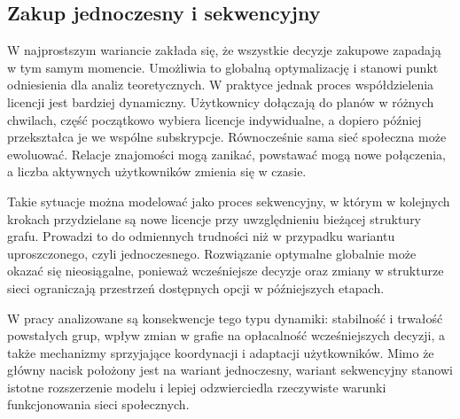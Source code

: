 

\subsection{Zakup jednoczesny i sekwencyjny}

W najprostszym wariancie zakłada się, że wszystkie decyzje zakupowe zapadają w tym samym momencie. Umożliwia to globalną optymalizację i stanowi punkt odniesienia dla analiz teoretycznych. W praktyce jednak proces współdzielenia licencji jest bardziej dynamiczny. Użytkownicy dołączają do planów w różnych chwilach, część początkowo wybiera licencje indywidualne, a dopiero później przekształca je we wspólne subskrypcje. Równocześnie sama sieć społeczna może ewoluować. Relacje znajomości mogą zanikać, powstawać mogą nowe połączenia, a liczba aktywnych użytkowników zmienia się w czasie.

Takie sytuacje można modelować jako proces sekwencyjny, w którym w kolejnych krokach przydzielane są nowe licencje przy uwzględnieniu bieżącej struktury grafu. Prowadzi to do odmiennych trudności niż w przypadku wariantu uproszczonego, czyli jednoczesnego. Rozwiązanie optymalne globalnie może okazać się nieosiągalne, ponieważ wcześniejsze decyzje oraz zmiany w strukturze sieci ograniczają przestrzeń dostępnych opcji w późniejszych etapach.

W pracy analizowane są konsekwencje tego typu dynamiki: stabilność i trwałość powstałych grup, wpływ zmian w grafie na opłacalność wcześniejszych decyzji, a także mechanizmy sprzyjające koordynacji i adaptacji użytkowników. Mimo że główny nacisk położony jest na wariant jednoczesny, wariant sekwencyjny stanowi istotne rozszerzenie modelu i lepiej odzwierciedla rzeczywiste warunki funkcjonowania sieci społecznych.
